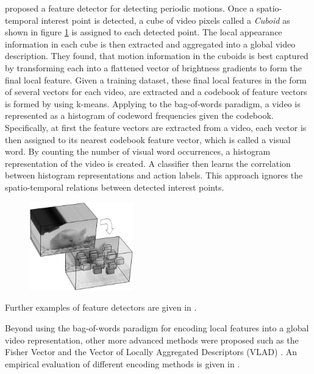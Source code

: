 \textcite{dollar_behavior_2005} proposed a feature detector for detecting periodic motions.
Once a spatio-temporal interest point is detected, a cube of video pixels called a \textit{Cuboid} as shown in figure \ref{fig:dollar_cuboids} is assigned to each detected point.
The local appearance information in each cube is then extracted and aggregated into a global video description.
They found, that motion information in the cuboids is best captured by transforming each into a flattened vector of brightness gradients to form the final local feature.
Given a training dataset, these final local features in the form of several vectors for each video, are extracted and a codebook of feature vectors is formed by using k-means.
Applying to the bag-of-words paradigm, a video is represented as a histogram of codeword frequencies given the codebook.
Specifically, at first the feature vectors are extracted from a video, each vector is then assigned to its nearest codebook feature vector, which is called a visual word.
By counting the number of visual word occurrences, a histogram representation of the video is created.
A classifier then learns the correlation between histogram representations and action labels.
This approach ignores the spatio-temporal relations between detected interest points.

\begin{figure}[H]
    \centering
    \includegraphics[width=0.4\textwidth]{img_conventional/dollar_cuboids}
    \caption{\cite{dollar_behavior_2005}}
    \label{fig:dollar_cuboids}
\end{figure}

Further examples of feature detectors are given in \cite{poppe_survey_2010}.

Beyond using the bag-of-words paradigm for encoding local features into a global video representation, other more advanced methods were proposed such as the Fisher Vector\cite{perronnin_fisher_2007} and the Vector of Locally Aggregated Descriptors (VLAD) \cite{jegou_aggregating_2010}.
An empirical evaluation of different encoding methods is given in \cite{peng_bag_2014}.

